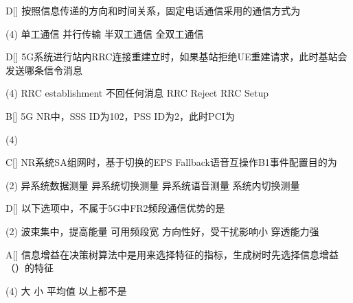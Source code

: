 \begin{choice}{D}[]
    按照信息传递的方向和时间关系，固定电话通信采用的通信方式为
    \begin{tasks}(4)
        \task 单工通信
        \task 并行传输
        \task 半双工通信
        \task 全双工通信
    \end{tasks}
\end{choice}

\begin{choice}{D}[]
    5G系统进行站内RRC连接重建立时，如果基站拒绝UE重建请求，此时基站会发送哪条信令消息
    \begin{tasks}(4)
        \task RRC establishment
        \task 不回任何消息
        \task RRC Reject
        \task RRC Setup
    \end{tasks}
\end{choice}


\begin{choice}{B}[]
    5G NR中，SSS ID为102，PSS ID为2，此时PCI为
    \begin{tasks}(4)
    \end{tasks}
\end{choice}



\begin{choice}{C}[]
    NR系统SA组网时，基于切换的EPS Fallback语音互操作B1事件配置目的为
    \begin{tasks}(2)
        \task 异系统数据测量
        \task 异系统切换测量
        \task 异系统语音测量
        \task 系统内切换测量
    \end{tasks}
\end{choice}



\begin{choice}{D}[]
    以下选项中，不属于5G中FR2频段通信优势的是
    \begin{tasks}(2)
        \task 波束集中，提高能量
        \task 可用频段宽
        \task 方向性好，受干扰影响小
        \task 穿透能力强
    \end{tasks}
\end{choice}




\begin{choice}{A}[]
    信息增益在决策树算法中是用来选择特征的指标，生成树时先选择信息增益（\quad）的特征
    \begin{tasks}(4)
        \task 大
        \task 小
        \task 平均值
        \task 以上都不是
    \end{tasks}
\end{choice}

